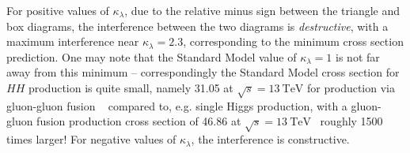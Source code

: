 For positive values of $\kappa_{\lambda}$, due to the relative minus sign between the triangle 
and box diagrams, the interference between the two diagrams is \emph{destructive}, with a maximum interference 
near $\kappa_{\lambda} = 2.3$, corresponding to the minimum cross section prediction. One may note that the 
Standard Model value of $\kappa_{\lambda} = 1$ is not far away from this minimum -- correspondingly the 
Standard Model cross section for $HH$ production is quite small, namely \SI{31.05}{\fb} at $\sqrt{s} = \SI{13}{\TeV}$ for production via gluon-gluon fusion ~\cite{HH1,HH2,HH3,HH4,HH5,HH6,HH7,HH8} compared to, e.g. single Higgs 
production, with a gluon-gluon fusion production cross section of \SI{46.86}{\pb} at $\sqrt{s} = \SI{13}{\TeV}$~\cite{Higgsxs} roughly 1500 times larger! For negative values of $\kappa_{\lambda}$, the interference is constructive.
